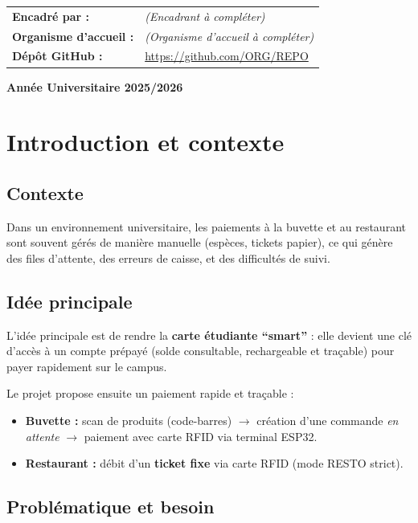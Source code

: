 \documentclass[12pt,a4paper]{report}
\newcommand{\GitHubURL}{\url{https://github.com/ORG/REPO}}
\newcommand{\Supervisor}{\textit{(Encadrant à compléter)}}
\newcommand{\HostOrg}{\textit{(Organisme d’accueil à compléter)}}
\newcommand{\AcademicYear}{2025/2026}
\begin{document}
\begin{titlepage}
  \vspace{16pt}

  \begin{tabular}{ll}
    \textbf{Encadré par :} & \Supervisor\\[4pt]
    \textbf{Organisme d’accueil :} & \HostOrg\\[4pt]
    \textbf{Dépôt GitHub :} & \GitHubURL\\
  \end{tabular}

  \vfill
  {\normalsize\bfseries Année Universitaire \AcademicYear\par}
\end{titlepage}

\tableofcontents
\newpage

\chapter{Introduction et contexte}
\section{Contexte}
Dans un environnement universitaire, les paiements à la buvette et au restaurant sont souvent gérés de manière manuelle (espèces, tickets papier), ce qui génère des files d’attente, des erreurs de caisse, et des difficultés de suivi.

\section{Idée principale}
L’idée principale est de rendre la \textbf{carte étudiante “smart”} : elle devient une clé d’accès à un compte prépayé (solde consultable, rechargeable et traçable) pour payer rapidement sur le campus.

Le projet propose ensuite un paiement rapide et traçable :
\begin{itemize}
  \item \textbf{Buvette :} scan de produits (code-barres) \(\rightarrow\) création d’une commande \textit{en attente} \(\rightarrow\) paiement avec carte RFID via terminal ESP32.
  \item \textbf{Restaurant :} débit d’un \textbf{ticket fixe} via carte RFID (mode RESTO strict).
\end{itemize}

\section{Problématique et besoin}
\end{document}
